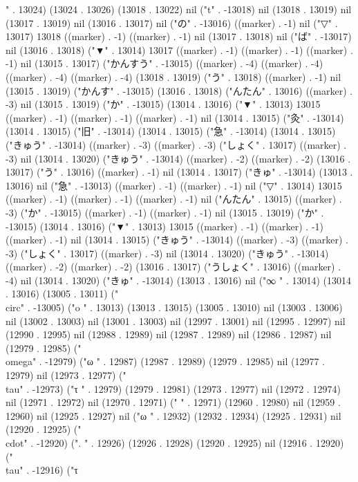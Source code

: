 " . 13024) (13024 . 13026) (13018 . 13022) nil ("t" . -13018) nil (13018 . 13019) nil (13017 . 13019) nil (13016 . 13017) nil ("の" . -13016) ((marker) . -1) nil ("▽" . 13017) 13018 ((marker) . -1) ((marker) . -1) nil (13017 . 13018) nil ("ば" . -13017) nil (13016 . 13018) ("▼" . 13014) 13017 ((marker) . -1) ((marker) . -1) ((marker) . -1) nil (13015 . 13017) ("かんすう" . -13015) ((marker) . -4) ((marker) . -4) ((marker) . -4) ((marker) . -4) (13018 . 13019) ("う" . 13018) ((marker) . -1) nil (13015 . 13019) ("かんす" . -13015) (13016 . 13018) ("んたん" . 13016) ((marker) . -3) nil (13015 . 13019) ("か" . -13015) (13014 . 13016) ("▼" . 13013) 13015 ((marker) . -1) ((marker) . -1) ((marker) . -1) nil (13014 . 13015) ("灸" . -13014) (13014 . 13015) ("旧" . -13014) (13014 . 13015) ("急" . -13014) (13014 . 13015) ("きゅう" . -13014) ((marker) . -3) ((marker) . -3) ("しょく" . 13017) ((marker) . -3) nil (13014 . 13020) ("きゅう" . -13014) ((marker) . -2) ((marker) . -2) (13016 . 13017) ("う" . 13016) ((marker) . -1) nil (13014 . 13017) ("きゅ" . -13014) (13013 . 13016) nil ("急" . -13013) ((marker) . -1) ((marker) . -1) nil ("▽" . 13014) 13015 ((marker) . -1) ((marker) . -1) ((marker) . -1) nil ("んたん" . 13015) ((marker) . -3) ("か" . -13015) ((marker) . -1) ((marker) . -1) nil (13015 . 13019) ("か" . -13015) (13014 . 13016) ("▼" . 13013) 13015 ((marker) . -1) ((marker) . -1) ((marker) . -1) nil (13014 . 13015) ("きゅう" . -13014) ((marker) . -3) ((marker) . -3) ("しょく" . 13017) ((marker) . -3) nil (13014 . 13020) ("きゅう" . -13014) ((marker) . -2) ((marker) . -2) (13016 . 13017) ("うしょく" . 13016) ((marker) . -4) nil (13014 . 13020) ("きゅ" . -13014) (13013 . 13016) nil ("∞
" . 13014) (13014 . 13016) (13005 . 13011) ("\\circ" . -13005) ("o
" . 13013) (13013 . 13015) (13005 . 13010) nil (13003 . 13006) nil (13002 . 13003) nil (13001 . 13003) nil (12997 . 13001) nil (12995 . 12997) nil (12990 . 12995) nil (12988 . 12989) nil (12987 . 12989) nil (12986 . 12987) nil (12979 . 12985) ("\\omega" . -12979) ("ω
" . 12987) (12987 . 12989) (12979 . 12985) nil (12977 . 12979) nil (12973 . 12977) ("\\tau" . -12973) ("τ
" . 12979) (12979 . 12981) (12973 . 12977) nil (12972 . 12974) nil (12971 . 12972) nil (12970 . 12971) (" " . 12971) (12960 . 12980) nil (12959 . 12960) nil (12925 . 12927) nil ("ω
" . 12932) (12932 . 12934) (12925 . 12931) nil (12920 . 12925) ("\\cdot" . -12920) (".
" . 12926) (12926 . 12928) (12920 . 12925) nil (12916 . 12920) ("\\tau" . -12916) ("τ
